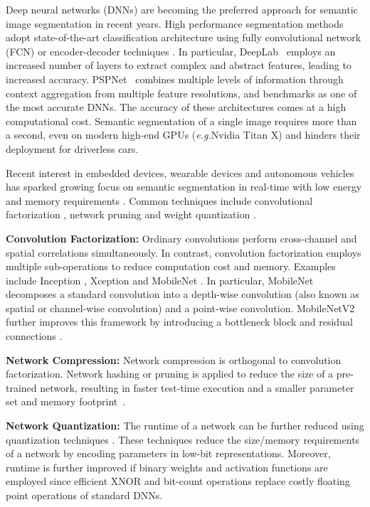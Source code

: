 \documentclass[runningheads]{llncs}
\def\eg{\emph{e.g.}}
\newcommand{\subsubsubsection}[1]{\vspace{0.2em}\noindent\textbf{\textcolor[rgb]{0,.1,.4}{#1:}}}
\begin{document}
Deep neural networks (DNNs) are becoming the preferred approach for semantic image segmentation in recent years. High performance segmentation methods adopt state-of-the-art classification architecture using fully convolutional network (FCN) \cite{long2016} or encoder-decoder techniques \cite{badrinarayanan2017}. In particular, DeepLab~\cite{chen2016} employs an increased number of layers to extract complex and abstract features, leading to increased accuracy. PSPNet~\cite{zhao2017a} combines multiple levels of information through context aggregation from multiple feature resolutions, and benchmarks as one of the most accurate DNNs. The accuracy of these architectures comes at a high computational cost. Semantic segmentation of a single image requires more than a second, even on modern high-end GPUs (\eg Nvidia Titan X) and hinders their deployment for driverless cars.

Recent interest in embedded devices, wearable devices and autonomous vehicles has sparked growing focus on semantic segmentation in real-time with low energy and memory requirements \cite{badrinarayanan2017,paszke2016,zhao2017b,romera2018,hubara2016,rastegari2016,wu2018}. Common techniques include convolutional factorization \cite{howard2017,sandler2018,chollet2016}, network pruning \cite{han2016,li2017} and weight quantization \cite{hubara2016,rastegari2016,wu2018}.

\subsubsubsection{Convolution Factorization} Ordinary convolutions perform cross-channel and spatial correlations simultaneously. In contrast, convolution factorization employs multiple sub-operations to reduce computation cost and memory. Examples include Inception \cite{szegedy2016}, Xception \cite{chollet2016} and MobileNet \cite{howard2017,sandler2018}. In particular, MobileNet \cite{howard2017} decomposes a standard convolution into a depth-wise convolution (also known as spatial or channel-wise convolution) and a  point-wise convolution. MobileNetV2 \cite{sandler2018} further improves this framework by introducing a bottleneck block and residual connections \cite{he2015}.

\subsubsubsection{Network Compression} Network compression is orthogonal to convolution factorization. Network hashing or pruning is applied to reduce the size of a pre-trained network, resulting in faster test-time execution and a smaller parameter set and memory footprint~\cite{han2016,li2017}.

\subsubsubsection{Network Quantization} The runtime of a network can be further reduced using quantization techniques \cite{hubara2016,rastegari2016,wu2018}. These techniques reduce the size/memory requirements of a network by encoding parameters in low-bit representations. Moreover, runtime is further improved if binary weights and activation functions are employed since efficient XNOR and bit-count operations replace costly floating point operations of standard DNNs.
\end{document}
